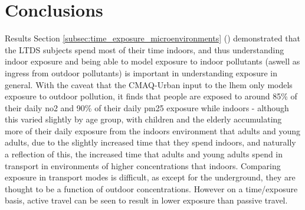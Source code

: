 \section{Conclusions}
\label{sec:2conclusions}


Results Section \ref{subsec:time_exposure_microenvironments} () demonstrated that the LTDS subjects spend most of their time indoors, and thus understanding indoor exposure and being able to model exposure to indoor pollutants (aswell as ingress from outdoor pollutants) is important in understanding exposure in general. With the caveat that the CMAQ-Urban input to the \gls{lhem} only models exposure to outdoor pollution, it finds that people are exposed to around 85\% of their daily \gls{no2} and 90\% of their daily \gls{pm25} exposure while indoors - although this varied slightly by age group, with children and the elderly accumulating more of their daily exposure from the indoors environment that adults and young adults, due to the slightly increased time that they spend indoors, and naturally a reflection of this, the increased time that adults and young adults spend in transport in environments of higher concentrations that indoors. Comparing exposure in transport modes is difficult, as except for the underground, they are thought to be a function of outdoor concentrations. However on a time/exposure basis, active travel can be seen to result in lower exposure than passive travel.


